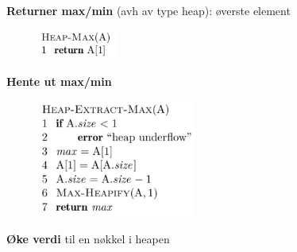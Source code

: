 \documentclass[12pt]{report}
\begin{document}
\begin{multicols}{2}

\par

{\fontsize{13pt}{15.6pt}\selectfont \textbf{Returner max/min} (avh av type heap): øverste element\par}\par




\begin{figure}[H]
	\begin{Center}
		\includegraphics[width=1.03in,height=0.38in]{./media/image89.png}
	\end{Center}
\end{figure}



\par

{\fontsize{13pt}{15.6pt}\selectfont \textbf{Hente ut max/min}\par}\par




\begin{figure}[H]
	\begin{Center}
		\includegraphics[width=2.06in,height=1.52in]{./media/image90.png}
	\end{Center}
\end{figure}



\par

{\fontsize{13pt}{15.6pt}\selectfont \textbf{Øke verdi} til en nøkkel i heapen\par}\par




\end{multicols}
\end{document}
